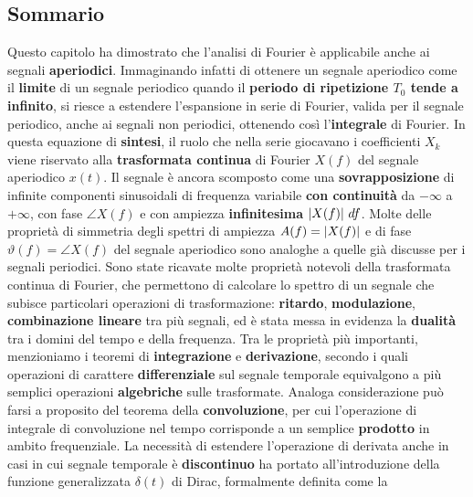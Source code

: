\documentclass[12pt,oneside,openany]{memoir}
\numberwithin{equation}{subsection}
\DeclarePairedDelimiter{\abs}{\lvert}{\rvert}
\newcommand{\df}{\ df}
\begin{document}

\newpage
\subsection{Sommario}
Questo capitolo ha dimostrato che l'analisi di Fourier \`e applicabile anche ai
segnali \textbf{aperiodici}. Immaginando infatti di ottenere un segnale
aperiodico come il \textbf{limite} di un segnale periodico quando il
\textbf{periodo di ripetizione $T_0$ tende a infinito}, si riesce a estendere
l'espansione in serie di Fourier, valida per il segnale periodico, anche ai
segnali non periodici, ottenendo cos\`i l'\textbf{integrale} di Fourier. In 
questa equazione di \textbf{sintesi}, il ruolo che nella serie giocavano i
coefficienti $X_k$ viene riservato alla \textbf{trasformata continua}
di Fourier $X(f)$ del segnale aperiodico $x(t)$. Il segnale \`e ancora scomposto
come una \textbf{sovrapposizione} di infinite componenti sinusoidali di
frequenza variabile \textbf{con continuit\`a} da $-\infty$ a $+\infty$, con fase
$\angle X(f)$ e con ampiezza \textbf{infinitesima} $\abs{X(f)} \df$. Molte delle
propriet\`a di simmetria degli spettri di ampiezza $A(f) = \abs{X(f)}$ e di fase
$\vartheta(f) = \angle X(f)$ del segnale aperiodico sono analoghe a quelle gi\`a
discusse per i segnali periodici.
\bigbreak
Sono state ricavate molte propriet\`a notevoli della trasformata continua di
Fourier, che permettono di calcolare lo spettro di un segnale che subisce
particolari operazioni di trasformazione: \textbf{ritardo},
\textbf{modulazione}, \textbf{combinazione lineare} tra pi\`u segnali, ed \`e
stata messa in evidenza la \textbf{dualit\`a} tra i domini del tempo e della
frequenza. Tra le propriet\`a pi\`u importanti, menzioniamo i teoremi di
\textbf{integrazione} e \textbf{derivazione}, secondo i quali operazioni di
carattere \textbf{differenziale} sul segnale temporale equivalgono a pi\`u
semplici operazioni \textbf{algebriche} sulle trasformate. Analoga
considerazione pu\`o farsi a proposito del teorema della \textbf{convoluzione},
per cui l'operazione di integrale di convoluzione nel tempo corrisponde a un
semplice \textbf{prodotto} in ambito frequenziale.
\bigbreak
La necessit\`a di estendere l'operazione di derivata anche in casi in cui
segnale temporale \`e \textbf{discontinuo} ha portato all'introduzione della
funzione generalizzata $\delta(t)$ di Dirac, formalmente definita come la
\end{document}
